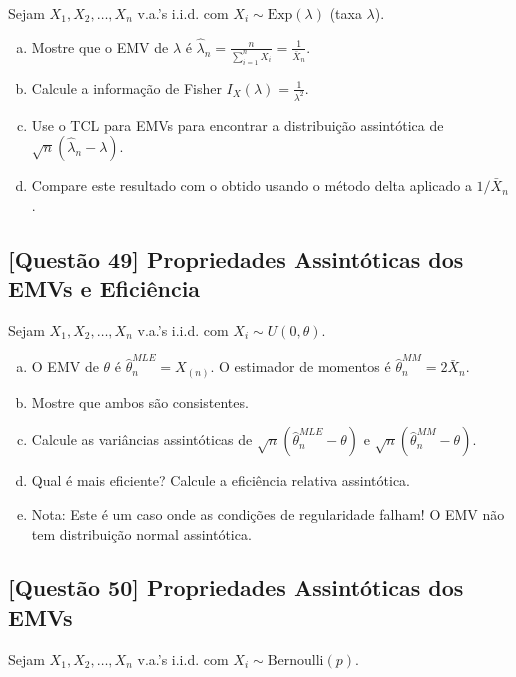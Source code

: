 \documentclass[12pt,a4paper]{article}
\begin{document}
Sejam $X_1, X_2, \ldots, X_n$ v.a.'s i.i.d. com $X_i \sim \text{Exp}(\lambda)$ (taxa $\lambda$).

\begin{enumerate}[(a)]
    \item Mostre que o EMV de $\lambda$ é $\hat{\lambda}_n = \frac{n}{\sum_{i=1}^n X_i} = \frac{1}{\bar{X}_n}$.
    \item Calcule a informação de Fisher $I_X(\lambda) = \frac{1}{\lambda^2}$.
    \item Use o TCL para EMVs para encontrar a distribuição assintótica de $\sqrt{n}(\hat{\lambda}_n - \lambda)$.
    \item Compare este resultado com o obtido usando o método delta aplicado a $1/\bar{X}_n$.
\end{enumerate}

\subsection*{[Questão 49] Propriedades Assintóticas dos EMVs e Eficiência}

Sejam $X_1, X_2, \ldots, X_n$ v.a.'s i.i.d. com $X_i \sim U(0, \theta)$.

\begin{enumerate}[(a)]
    \item O EMV de $\theta$ é $\hat{\theta}_n^{MLE} = X_{(n)}$. O estimador de momentos é $\hat{\theta}_n^{MM} = 2\bar{X}_n$.
    \item Mostre que ambos são consistentes.
    \item Calcule as variâncias assintóticas de $\sqrt{n}(\hat{\theta}_n^{MLE} - \theta)$ e $\sqrt{n}(\hat{\theta}_n^{MM} - \theta)$.
    \item Qual é mais eficiente? Calcule a eficiência relativa assintótica.
    \item Nota: Este é um caso onde as condições de regularidade falham! O EMV não tem distribuição normal assintótica.
\end{enumerate}

\subsection*{[Questão 50] Propriedades Assintóticas dos EMVs}

Sejam $X_1, X_2, \ldots, X_n$ v.a.'s i.i.d. com $X_i \sim \text{Bernoulli}(p)$.
\end{document}
